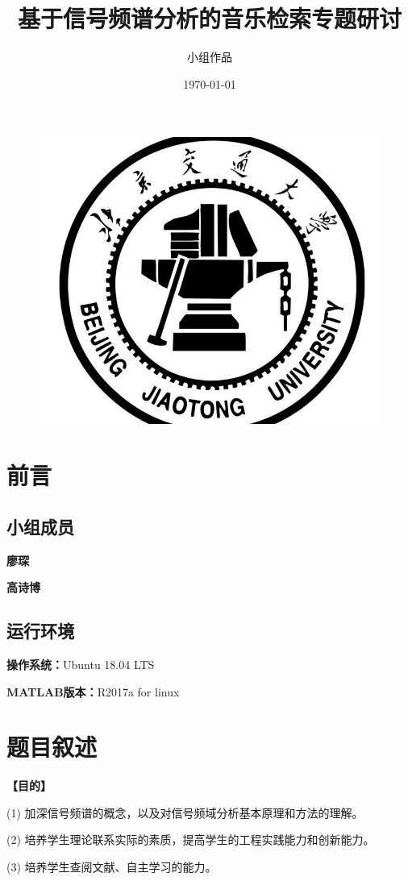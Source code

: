 \documentclass[11pt,a4paper,UTF8]{ctexart}
\title{基于信号频谱分析的音乐检索专题研讨}
\author{小组作品}
\date{\today}
\begin{document}
	\begin{figure}
		\centering
		\includegraphics[width=0.7\linewidth]{Pictures/BJTU_logo}
	\end{figure}

	
	\maketitle
	\newpage
	\tableofcontents
	\newpage
	
	\section{前言}
	\subsection{小组成员}
	
	\textbf{廖琛}\quad {}
	
	\textbf{高诗博}
	
	\subsection{运行环境}
	\textbf{操作系统：}Ubuntu 18.04 LTS
	
	\textbf{MATLAB版本：}R2017a for linux

	\section{题目叙述}
	\textbf{【目的】}
	
	(1) 加深信号频谱的概念，以及对信号频域分析基本原理和方法的理解。

	
	(2) 培养学生理论联系实际的素质，提高学生的工程实践能力和创新能力。
	

	(3) 培养学生查阅文献、自主学习的能力。
\end{document}
